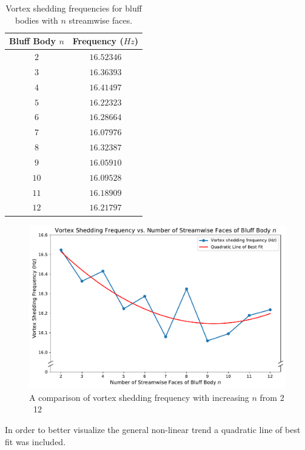 \begin{table}[H]
	\centering
	\renewcommand{\arraystretch}{1.3}
	\begin{tabular}{|c|c|}
		\hline
		\textbf{Bluff Body $n$} & \textbf{Frequency ($Hz$)} \\
		\hline
		$2$  & $16.52346$ \\
		\hline
		$3$  & $16.36393$ \\
		\hline
		$4$  & $16.41497$ \\
		\hline
		$5$  & $16.22323$ \\
		\hline
		$6$  & $16.28664$ \\
		\hline
		$7$  & $16.07976$ \\
		\hline
		$8$  & $16.32387$ \\
		\hline
		$9$  & $16.05910$ \\
		\hline
		$10$ & $16.09528$ \\
		\hline
		$11$ & $16.18909$ \\
		\hline
		$12$ & $16.21797$ \\
		\hline
	\end{tabular}
	\caption{Vortex shedding frequencies for bluff bodies with $n$ streamwise faces.}
	\label{tab:frequencyData}
\end{table}


\begin{figure}[H]
	\centering
	\includegraphics[width=\textwidth]{images/overall}
	\caption{A comparison of vortex shedding frequency with increasing $n$ from 2 \textendash\ 12}
	\label{fig:overall} 
\end{figure}

In order to better visualize the general non-linear trend a quadratic line of best fit was included. 


